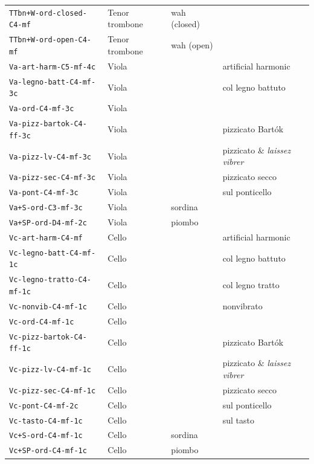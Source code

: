 \documentclass{bmcart}
\begin{document}
\begin{backmatter}
\begin{table}
\begin{tabular}{llll}
        \texttt{TTbn+W-ord-closed-C4-mf} & Tenor trombone & wah (closed) & \\
        \texttt{TTbn+W-ord-open-C4-mf} & Tenor trombone & wah (open) & \\ \hline
        \texttt{Va-art-harm-C5-mf-4c} & Viola & & artificial harmonic \\
        \texttt{Va-legno-batt-C4-mf-3c} & Viola & & col legno battuto \\
        \texttt{Va-ord-C4-mf-3c} & Viola & & \\
        \texttt{Va-pizz-bartok-C4-ff-3c} & Viola & & pizzicato Bart\'ok \\
        \texttt{Va-pizz-lv-C4-mf-3c} & Viola & & pizzicato \& \emph{laissez vibrer} \\
        \texttt{Va-pizz-sec-C4-mf-3c} & Viola & & pizzicato secco \\
        \texttt{Va-pont-C4-mf-3c} & Viola & & sul ponticello \\
        \texttt{Va+S-ord-C3-mf-3c} & Viola & sordina & \\
        \texttt{Va+SP-ord-D4-mf-2c} & Viola & piombo & \\ \hline
        \texttt{Vc-art-harm-C4-mf} & Cello & & artificial harmonic \\
        \texttt{Vc-legno-batt-C4-mf-1c} & Cello & & col legno battuto \\
        \texttt{Vc-legno-tratto-C4-mf-1c} & Cello & & col legno tratto \\
        \texttt{Vc-nonvib-C4-mf-1c} & Cello & & nonvibrato \\
        \texttt{Vc-ord-C4-mf-1c} & Cello & & \\
        \texttt{Vc-pizz-bartok-C4-ff-1c} & Cello & & pizzicato Bart\'ok \\
        \texttt{Vc-pizz-lv-C4-mf-1c} & Cello & & pizzicato \& \emph{laissez vibrer} \\
        \texttt{Vc-pizz-sec-C4-mf-1c} & Cello & & pizzicato secco \\
        \texttt{Vc-pont-C4-mf-2c} & Cello & & sul ponticello \\
        \texttt{Vc-tasto-C4-mf-1c} & Cello & & sul tasto \\
        \texttt{Vc+S-ord-C4-mf-1c} & Cello & sordina & \\
        \texttt{Vc+SP-ord-C4-mf-1c} & Cello & piombo & \\ \hline
    \end{tabular}
\end{table}


\end{backmatter}
\end{document}
